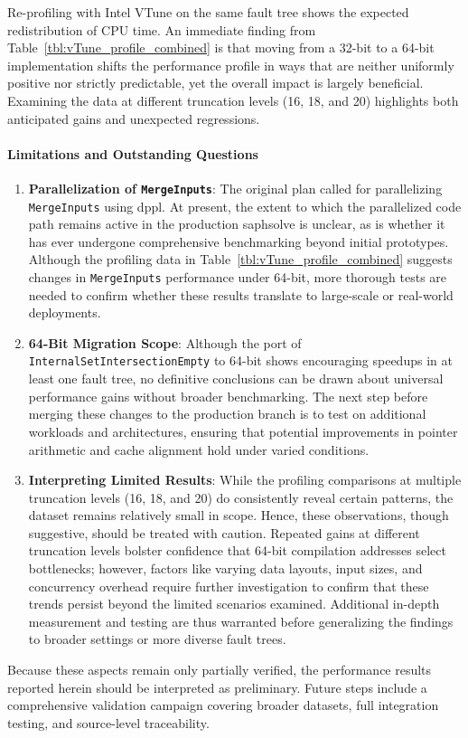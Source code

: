 

Re-profiling with Intel VTune on the same fault tree shows the expected redistribution of CPU time. An immediate finding from Table~\ref{tbl:vTune_profile_combined} is that moving from a 32-bit to a 64-bit implementation shifts the performance profile in ways that are neither uniformly positive nor strictly predictable, yet the overall impact is largely beneficial. Examining the data at different truncation levels (16, 18, and 20) highlights both anticipated gains and unexpected regressions.



\paragraph{Limitations and Outstanding Questions}
\label{sec:limitations_saphsolve}

\begin{enumerate}
    \item \textbf{Parallelization of \texttt{MergeInputs}}: The original plan called for parallelizing \texttt{MergeInputs} using \acrshort{dppl}. At present, the extent to which the parallelized code path remains active in the production \acrshort{saphsolve} is unclear, as is whether it has ever undergone comprehensive benchmarking beyond initial prototypes. Although the profiling data in Table~\ref{tbl:vTune_profile_combined} suggests changes in \texttt{MergeInputs} performance under 64-bit, more thorough tests are needed to confirm whether these results translate to large-scale or real-world deployments.
    
    \item \textbf{64-Bit Migration Scope}: Although the port of \texttt{InternalSetIntersectionEmpty} to 64-bit shows encouraging speedups in at least one fault tree, no definitive conclusions can be drawn about universal performance gains without broader benchmarking. The next step before merging these changes to the production branch is to test on additional workloads and architectures, ensuring that potential improvements in pointer arithmetic and cache alignment hold under varied conditions.

    \item \textbf{Interpreting Limited Results}: While the profiling comparisons at multiple truncation levels (16, 18, and 20) do consistently reveal certain patterns, the dataset remains relatively small in scope. Hence, these observations, though suggestive, should be treated with caution. Repeated gains at different truncation levels bolster confidence that 64-bit compilation addresses select bottlenecks; however, factors like varying data layouts, input sizes, and concurrency overhead require further investigation to confirm that these trends persist beyond the limited scenarios examined. Additional in-depth measurement and testing are thus warranted before generalizing the findings to broader settings or more diverse fault trees.
\end{enumerate}

Because these aspects remain only partially verified, the performance results reported herein should be interpreted as preliminary.  Future steps include a comprehensive validation campaign covering broader datasets, full integration testing, and source-level traceability.